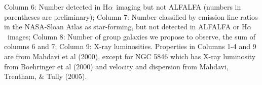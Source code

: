 \documentclass[11pt]{article}
\newcommand{\Halpha}{H$\alpha$}
\begin{document}
\begin{table}[h!]
Column 6: Number detected in \Halpha\ imaging but not ALFALFA (numbers in parentheses are preliminary); Column 7: Number classified by emission line ratios in the NASA-Sloan Atlas as star-forming,
but not detected in ALFALFA or \Halpha\ images;
Column 8: Number of group galaxies we propose to observe, the sum of columns 6 and 7;
Column 9: X-ray luminosities. Properties in Columns 1-4 and 9 are from
Mahdavi {et al} (2000), except for NGC 5846 which has X-ray
luminosity from Boehringer {et al} (2000) and velocity and dispersion
from Mahdavi, Trentham, \& Tully (2005).
\end{table}
\end{document}
